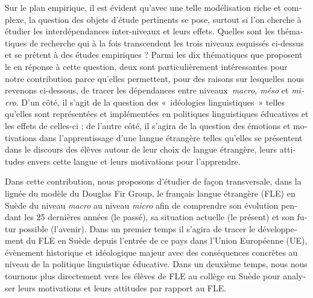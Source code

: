 \documentclass[french, output=paper]{langscibook}
\begin{document}
\begin{otherlanguage}{french}
\begin{sloppypar}
Sur le plan empirique, il est évident qu’avec une telle modélisation riche et complexe, la question des objets d’étude pertinents se pose, surtout si l’on cherche à étudier les interdépendances inter-niveaux et leurs effets. Quelles sont les thématiques de recherche qui à la fois transcendent les trois niveaux esquissés ci-dessus et se prêtent à des études empiriques ? Parmi les dix thématiques que proposent le \citet{TheDouglasFirgroup2016} en réponse à cette question, deux sont particulièrement intéressantes pour notre contribution parce qu’elles permettent, pour des raisons sur lesquelles nous revenons ci-dessous, de tracer les dépendances entre niveaux~\textit{macro, méso} et \textit{micro}. D’un côté, il s’agit de la question des «~idéologies linguistiques~» telles qu’elles sont représentées et implémentées en politiques linguistiques éducatives et les effets de celles-ci ; de l’autre côté, il s’agira de la question des émotions et motivations dans l’apprentissage d’une langue étrangère telles qu’elles se présentent dans le discours des élèves autour de leur choix de langue étrangère, leurs attitudes envers cette langue et leurs motivations pour l’apprendre.
\end{sloppypar}

Dans cette contribution, nous proposons d’étudier de façon transversale, dans la lignée du modèle du Douglas Fir Group, le français langue étrangère (FLE) en Suède du niveau \textit{macro} au niveau \textit{micro} afin de comprendre son évolution pendant les 25 dernières années (le passé), sa situation actuelle (le présent) et son futur possible (l’avenir). Dans un premier temps il s’agira de tracer le développement du FLE en Suède depuis l’entrée de ce pays dans l’Union Européenne (UE), évènement historique et idéologique majeur avec des conséquences concrètes au niveau de la politique linguistique éducative. Dans un deuxième temps, nous nous tournons plus directement vers les élèves de FLE au collège en Suède pour analyser leurs motivations et leurs attitudes par rapport au FLE.


\end{otherlanguage}
\end{document}
